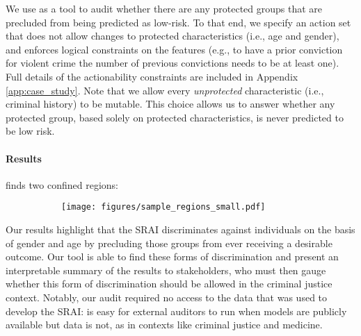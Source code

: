 We use \us{} as a tool to audit whether there are any protected groups that are precluded from being predicted as low-risk. To that end, we specify an action set that does not allow changes to protected characteristics (i.e., age and gender), and enforces logical constraints on the features (e.g., to have a prior conviction for violent crime the number of previous convictions needs to be at least one). Full details of the actionability constraints are included in Appendix \ref{app:case_study}. Note that we allow every \emph{unprotected} characteristic (i.e., criminal history) to be mutable. This choice allows us to answer whether any protected group, based solely on protected characteristics, is never predicted to be low risk. 

\paragraph{Results} %
\us{} finds two confined regions:

\begin{figure}[!h]
    \centering
    \begin{subfigure}
      \centering
      \texttt{[image: figures/sample\_regions\_small.pdf]}
    \end{subfigure}
\end{figure}

 Our results highlight that the SRAI discriminates against individuals on the basis of gender and age by precluding those groups from ever receiving a desirable outcome. 
 Our tool is able to find these forms of discrimination and present an interpretable summary of the results to stakeholders, who must then gauge whether this form of discrimination should be allowed in the criminal justice context. 
 Notably, our audit required no access to the data that was used to develop the SRAI: \us{} is easy for external auditors to run when models are publicly available but data is not, as in contexts like criminal justice and medicine. %


